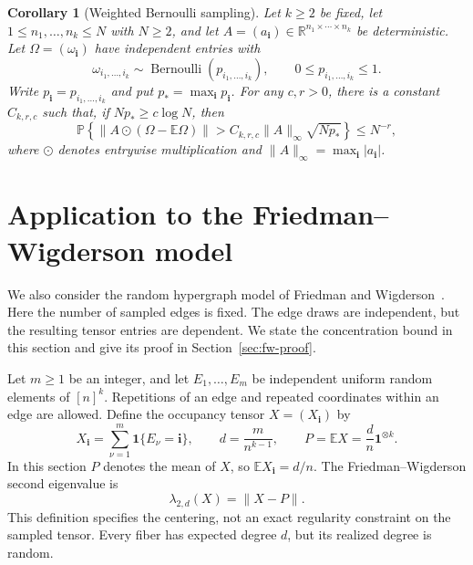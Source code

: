 \documentclass[10pt,a4paper]{amsart}
\numberwithin{equation}{section}
\newtheorem{corollary}[theorem]{Corollary}
\newcommand{\E}{\mathbb E}
\newcommand{\Pp}{\mathbb P}
\newcommand{\R}{\mathbb R}
\newcommand{\one}{\mathbf 1}
\begin{document}
\begin{corollary}[Weighted Bernoulli sampling]\label{cor:weighted}
Let $k\ge2$ be fixed, let $1\le n_1,\ldots,n_k\le N$ with $N\ge2$,
and let $A=(a_{\mathbf i})\in\R^{n_1\times\cdots\times n_k}$ be
deterministic. Let $\Omega=(\omega_{\mathbf i})$ have independent
entries with
\[
 \omega_{i_1,\ldots,i_k}\sim
 \operatorname{Bernoulli}(p_{i_1,\ldots,i_k}),
 \qquad 0\le p_{i_1,\ldots,i_k}\le1.
\]
Write $p_{\mathbf i}=p_{i_1,\ldots,i_k}$ and put
$p_*=\max_{\mathbf i}p_{\mathbf i}$.
For any $c,r>0$, there is a constant $C_{k,r,c}$ such that, if
$Np_*\ge c\log N$, then
\begin{equation}\label{eq:weighted}
 \Pp\left\{\|A\odot(\Omega-\E\Omega)\|>
 C_{k,r,c}\|A\|_\infty\sqrt{Np_*}\right\}\le N^{-r},
\end{equation}
where $\odot$ denotes entrywise multiplication and
$\|A\|_\infty=\max_{\mathbf i}|a_{\mathbf i}|$.
\end{corollary}

\section{Application to the Friedman--Wigderson model}\label{sec:fw}

We also consider the random hypergraph model of Friedman and
Wigderson~\cite[Section~6]{FW95}. Here the number of sampled
edges is fixed. The edge draws are independent, but the resulting
tensor entries are dependent. We state the concentration bound
in this section and give its proof in Section~\ref{sec:fw-proof}.

Let $m\ge1$ be an integer, and let $E_1,\ldots,E_m$ be independent
uniform random elements of $[n]^k$. Repetitions of an edge and
repeated coordinates within an edge are allowed. Define the
occupancy tensor $X=(X_{\mathbf i})$ by
\begin{equation}\label{eq:fw-model}
 X_{\mathbf i}=\sum_{\nu=1}^m\one\{E_\nu=\mathbf i\},
 \qquad d=\frac{m}{n^{k-1}},\qquad
 P=\E X=\frac dn\one^{\otimes k}.
\end{equation}
In this section $P$ denotes the mean of $X$, so $\E X_{\mathbf i}=d/n$.
The Friedman--Wigderson second eigenvalue is
\begin{equation}\label{eq:fw-lambda}
 \lambda_{2,d}(X)
 =\|X-P\|.
\end{equation}
This definition specifies the centering, not an exact regularity
constraint on the sampled tensor. Every fiber has expected degree $d$,
but its realized degree is random.
\end{document}

